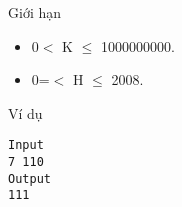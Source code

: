 Giới hạn
\begin{itemize}
	\item     0$<$ K  $\le$ 1000000000.   
	\item     0=$<$ H  $\le$ 2008.   
\end{itemize}
Ví dụ
\begin{verbatim}
Input
7 110
Output
111
\end{verbatim}